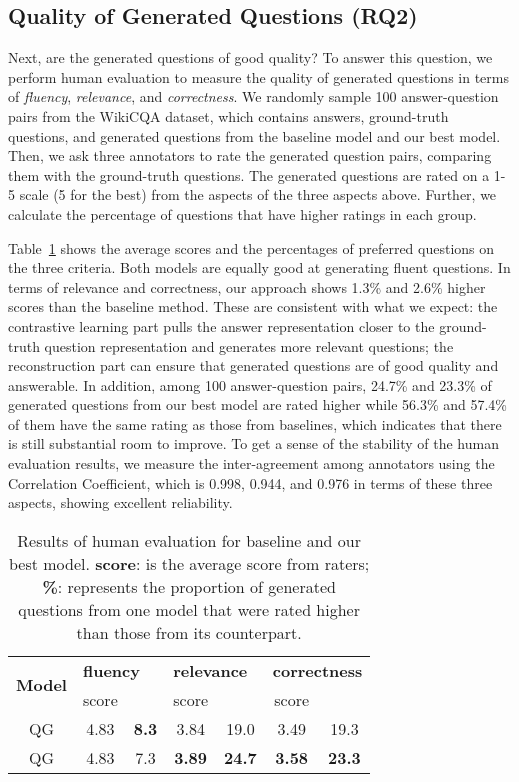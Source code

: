 \documentclass[11pt]{article}
\begin{document}
\subsection{Quality of Generated Questions (RQ2)}
Next, are the generated questions of good quality? To answer this question, we perform human evaluation to measure the quality of generated questions in terms of \textit{fluency}, \textit{relevance}, and \textit{correctness}.
We randomly sample 100 answer-question pairs from the WikiCQA dataset, which contains answers, ground-truth questions, and generated questions from the baseline model and our best model. 
Then, we ask three annotators to rate the generated question pairs, comparing them with the ground-truth questions.
The generated questions are rated on a 1-5 scale (5 for the best) from the aspects of the three aspects above.
Further, we calculate the percentage of questions that have higher ratings in each group.

\noindent Table~\ref{tab:human-evaluation} shows the average scores and the percentages of preferred questions on the three criteria.
Both models are equally good at generating fluent questions.
In terms of relevance and correctness, our approach shows 1.3\% and 2.6\% higher scores than the baseline method. These are consistent with what we expect: the contrastive learning part pulls the answer representation closer to the ground-truth question representation and generates more relevant questions; the reconstruction part can ensure that generated questions are of good quality and answerable.
In addition, among 100 answer-question pairs, 24.7\% and 23.3\% of generated questions from our best model are rated higher while 56.3\% and 57.4\% of them have the same rating as those from baselines, which indicates that there is still substantial room to improve.
To get a sense of the stability of the human evaluation results, we measure the inter-agreement among annotators using the Correlation Coefficient, which is 0.998, 0.944, and 0.976 in terms of these three aspects, showing excellent reliability.

\begin{table}[htbp!]
\centering\small
\begin{tabular}{ccccccc}
\hline
\multirow{2}{*}{\textbf{Model}} & \multicolumn{2}{l}{\textbf{fluency}} & \multicolumn{2}{l}{\textbf{relevance}} & \multicolumn{2}{l}{\textbf{correctness}}  \\
                       & score &  & score &  & score &  \\ 
\hline
QG & 4.83 & \textbf{8.3} & 3.84 & 19.0 & 3.49 & 19.3 \\
QG & 4.83 & 7.3 & \textbf{3.89} & \textbf{24.7} & \textbf{3.58} & \textbf{23.3}  \\
\hline
\end{tabular}
\caption{Results of human evaluation for baseline and our best model. \textbf{score}: is the average score from raters; \textbf{\%}: represents the proportion of generated questions from one model that were rated higher than those from its counterpart. }
\label{tab:human-evaluation}
\end{table}
\vspace{-0.3cm}
\end{document}
